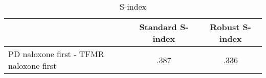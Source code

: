 \begin{table}[htbp] \centering
\def\sym#1{\ifmmode^{#1}\else\(^{#1}\)\fi}
  \caption{S-index} %
  \begin{adjustbox}{max width=\linewidth}\begin{tabular}{l*{2}{c}}
    \toprule
     & Standard S-index & Robust S-index \\ 
    \midrule
    PD naloxone first - TFMR naloxone first & .387 & .336\\ 
    \bottomrule
  \end{tabular} \end{adjustbox}
\end{table}